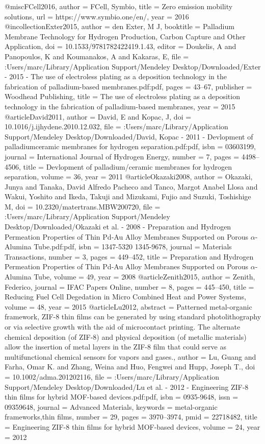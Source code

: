 @misc{FCell2016,
author = {FCell, Symbio},
title = {{Zero emission mobility solutions}},
url = {https://www.symbio.one/en/},
year = {2016}
}
@incollection{Exter2015,
author = {den Exter, M J},
booktitle = {Palladium Membrane Technology for Hydrogen Production, Carbon Capture and Other Application},
doi = {10.1533/9781782422419.1.43},
editor = {Doukelis, A and Panopoulos, K and Koumanakos, A and Kakaras, E},
file = {:Users/marc/Library/Application Support/Mendeley Desktop/Downloaded/Exter - 2015 - The use of electroless plating as a deposition technology in the fabrication of palladium-based membranes.pdf:pdf},
pages = {43--67},
publisher = {Woodhead Publishing},
title = {{The use of electroless plating as a deposition technology in the fabrication of palladium-based membranes}},
year = {2015}
}
@article{David2011,
author = {David, E and Kopac, J},
doi = {10.1016/j.ijhydene.2010.12.032},
file = {:Users/marc/Library/Application Support/Mendeley Desktop/Downloaded/David, Kopac - 2011 - Devlopment of palladiumceramic membranes for hydrogen separation.pdf:pdf},
isbn = {03603199},
journal = {International Journal of Hydrogen Energy},
number = {7},
pages = {4498--4506},
title = {{Devlopment of palladium/ceramic membranes for hydrogen separation}},
volume = {36},
year = {2011}
}
@article{Okazaki2008,
author = {Okazaki, Junya and Tanaka, David Alfredo Pacheco and Tanco, Margot Anabel Llosa and Wakui, Yoshito and Ikeda, Takuji and Mizukami, Fujio and Suzuki, Toshishige M},
doi = {10.2320/matertrans.MBW200720},
file = {:Users/marc/Library/Application Support/Mendeley Desktop/Downloaded/Okazaki et al. - 2008 - Preparation and Hydrogen Permeation Properties of Thin Pd-Au Alloy Membranes Supported on Porous $\alpha$-Alumina Tube.pdf:pdf},
isbn = {1347-5320
1345-9678},
journal = {Materials Transactions},
number = {3},
pages = {449--452},
title = {{Preparation and Hydrogen Permeation Properties of Thin Pd-Au Alloy Membranes Supported on Porous $\alpha$-Alumina Tube}},
volume = {49},
year = {2008}
}
@article{Zenith2015,
author = {Zenith, Federico},
journal = {IFAC Papers Online},
number = {8},
pages = {445--450},
title = {{Reducing Fuel Cell Degedation in Micro Combined Heat and Power Systems}},
volume = {48},
year = {2015}
}
@article{Lu2012,
abstract = {Patterned metal-organic framework, ZIF-8 thin films can be generated by using standard photolithography or via selective growth with the aid of microcontact printing. The alternate chemical deposition (of ZIF-8) and physical deposition (of metallic materials) allow the insertion of metal layers in the ZIF-8 film that could serve as multifunctional chemical sensors for vapors and gases.},
author = {Lu, Guang and Farha, Omar K. and Zhang, Weina and Huo, Fengwei and Hupp, Joseph T.},
doi = {10.1002/adma.201202116},
file = {:Users/marc/Library/Application Support/Mendeley Desktop/Downloaded/Lu et al. - 2012 - Engineering ZIF-8 thin films for hybrid MOF-based devices.pdf:pdf},
isbn = {0935-9648},
issn = {09359648},
journal = {Advanced Materials},
keywords = {metal-organic frameworks,thin films},
number = {29},
pages = {3970--3974},
pmid = {22718482},
title = {{Engineering ZIF-8 thin films for hybrid MOF-based devices}},
volume = {24},
year = {2012}
}
